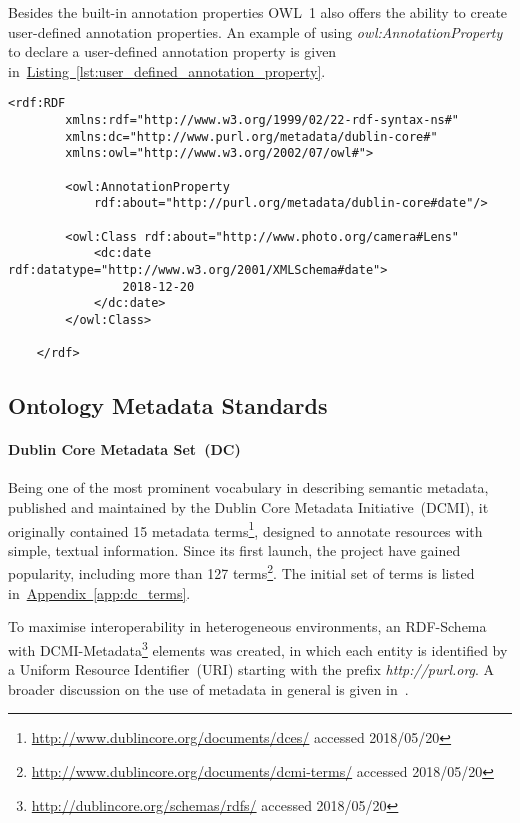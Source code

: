 Besides the built-in annotation properties OWL~1 also offers the ability to create user-defined annotation properties. An example of using \emph{owl:AnnotationProperty} to declare a user-defined annotation property is given in~\hyperref[lst:user_defined_annotation_property]{Listing~\ref*{lst:user_defined_annotation_property}}.
\begin{lstlisting}[frame=single,caption=Declaration of user-defined annotation property in OWL~1,label=lst:user_defined_annotation_property]
	<rdf:RDF
		xmlns:rdf="http://www.w3.org/1999/02/22-rdf-syntax-ns#"
		xmlns:dc="http://www.purl.org/metadata/dublin-core#"
		xmlns:owl="http://www.w3.org/2002/07/owl#">
		
		<owl:AnnotationProperty 
			rdf:about="http://purl.org/metadata/dublin-core#date"/>
		
		<owl:Class rdf:about="http://www.photo.org/camera#Lens"
			<dc:date rdf:datatype="http://www.w3.org/2001/XMLSchema#date">
				2018-12-20
			</dc:date>
		</owl:Class>
		
	</rdf>
\end{lstlisting}

\subsection{Ontology Metadata Standards}\label{sec:ontology_metadata_standards}

\paragraph{Dublin Core Metadata Set~(DC)}\label{sec:dublin_core_metadata_vocabulary} Being one of the most prominent vocabulary in describing semantic metadata, published and maintained by the Dublin Core Metadata Initiative~(DCMI), it originally contained 15 metadata terms\footnote{\url{http://www.dublincore.org/documents/dces/} accessed 2018/05/20},  designed to annotate resources with simple, textual information. Since its first launch, the project have gained popularity, including more than 127 terms\footnote{\url{http://www.dublincore.org/documents/dcmi-terms/} accessed 2018/05/20}. The initial set of terms is listed in~\hyperref[app:dc_terms]{Appendix~\ref*{app:dc_terms}}. 

To maximise interoperability in heterogeneous environments, an RDF-Schema with DCMI-Metadata\footnote{\url{http://dublincore.org/schemas/rdfs/} accessed 2018/05/20} elements was created, in which each entity is identified by a Uniform Resource Identifier~(URI) starting with the prefix \emph{http://purl.org}. A broader discussion on the use of metadata in general is given in~\cite{nilsson2010}.  

